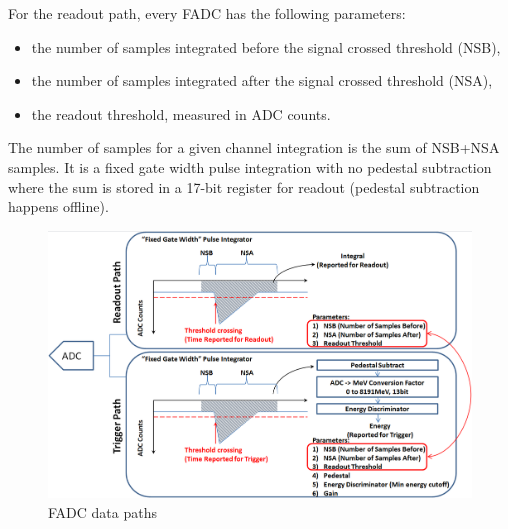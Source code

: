 For the readout path, every FADC has the following parameters:
 \begin{itemize}
 \item the number of samples integrated before the signal crossed threshold (NSB), 
 \item the number of samples integrated after the signal crossed threshold (NSA),
 \item the readout threshold, measured in ADC counts.
 \end{itemize}
The number of samples for a given channel integration is the sum of NSB+NSA samples. It is a fixed gate width pulse integration with no pedestal subtraction where the sum is stored in a 17-bit register for readout (pedestal subtraction happens offline). 
\begin{figure}[t]
\includegraphics[scale=0.4]{daq_trigger/figures/hps_trigger_data}
\caption{\small{FADC data paths}}
\label{fig:hps_trigger_data}
\end{figure}

